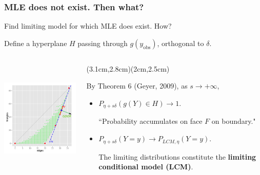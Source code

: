 \documentclass[ 10pt]{beamer}
\newcommand{\yobs}{y_{\text{obs}}}
\begin{document}
\frame
{
	\frametitle{MLE does not exist.  Then what?}
Find limiting model for which MLE does exist.  How?
\vspace{2mm}
\pause

Define a hyperplane $H$ passing through $g(\yobs)$, orthogonal to $\delta$.
\begin{columns}[]
\begin{column}[T]{0.43\textwidth}
\includegraphics[height=2.2in]{g9-H.png}
\end{column}
\begin{column}[t]{0.57\textwidth}
\pause
{}(3.1cm,2.8cm)(2cm,2.5cm)


\pause
By Theorem 6 (Geyer, 2009), as $s \to +\infty$,
\vspace{1mm}
\begin{itemize}
\item $P_{\eta + s \delta}( g(Y) \in H) \to 1.$
\vspace{1mm}

``Probability accumulates on face \alert{$F$} on boundary."
\vspace{3mm}

\pause
\item $P_{\eta + s \delta}( Y = y) \to P_{LCM, \eta}( Y = y)$.
\vspace{1mm}

The limiting distributions constitute the \textbf{limiting conditional model (LCM)}.
\end{itemize}
\end{column}
\end{columns}
}
\end{document}
